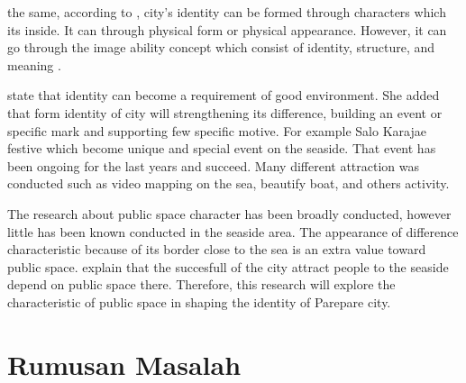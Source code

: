 \documentclass[11pt]{simart} %
\begin{document}
the same, according to \cite{hartanti2014}, city's identity can be formed through characters which its inside. It can through physical form or physical appearance. However, it can go through the image ability concept which consist of identity, structure, and meaning \citep{lycnh1984}.

\cite{hartanti2014} state that identity can become a requirement of good environment. She added that form identity of city will strengthening its difference, building an event or specific mark and supporting few specific motive. For example Salo Karajae festive which become unique and special event on the seaside. That event has been ongoing for the last years and succeed. Many different attraction was conducted such as video mapping on the sea, beautify boat, and others activity.

The research about public space character has been broadly conducted, however little has been known conducted in the seaside area. The appearance of difference characteristic because of its border close to the sea is an extra value toward public space.
\cite{hussein2014} explain that the succesfull of the city attract people to the seaside depend on public space there. Therefore, this research will explore the characteristic of public space in shaping the identity of Parepare city.

\section{Rumusan Masalah}
\end{document}
